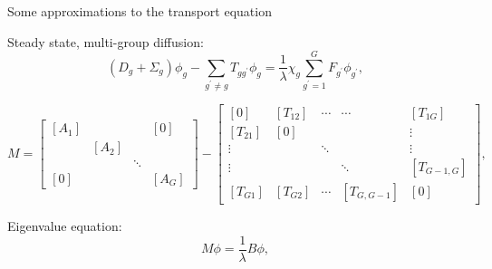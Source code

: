 \documentclass[pdf,aspectratio=169]{beamer}
\begin{document}
\begin{frame}{Some approximations to the transport equation}

Steady state, multi-group diffusion:
\begin{equation}
\left(D_{g}+\Sigma_{g}\right)\phi_{g}-\sum_{g^{\prime}\ne g}T_{gg^{\prime}}\phi_{g}=\frac{1}{\lambda}\chi_{g}\sum_{g^{\prime}=1}^{G}F_{g^{\prime}}\phi_{g^{\prime}},\label{eq:group-balance-orig}
\end{equation}


\begin{equation}
M=\left[\begin{array}{cccc}
\left[A_{1}\right] &  &  & \left[0\right]\\
 & \left[A_{2}\right]\\
 &  & \ddots\\
\left[0\right] &  &  & \left[A_{G}\right]
\end{array}\right]-\left[\begin{array}{ccccc}
[0] & \left[T_{12}\right] & \cdots & \cdots & \left[T_{1G}\right]\\
\left[T_{21}\right] & [0] &  &  & \vdots\\
\vdots &  & \ddots &  & \vdots\\
\vdots &  &  & \ddots & \left[T_{G-1,G}\right]\\
\left[T_{G1}\right] & \left[T_{G2}\right] & \cdots & \left[T_{G,G-1}\right] & [0]
\end{array}\right],
\end{equation}

Eigenvalue equation:
\begin{equation}
M\phi=\frac{1}{\lambda}B\phi,\label{eq:generalizedEigenproblem}
\end{equation}

\end{frame}
\end{document}

